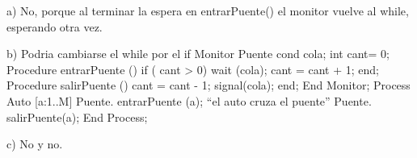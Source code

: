 a) No, porque al terminar la espera en entrarPuente() el monitor vuelve al while, esperando otra vez.

b) Podria cambiarse el while por el if
    Monitor Puente
        cond cola;
        int cant= 0;
        Procedure entrarPuente ()
            if ( cant > 0) wait (cola);
            cant = cant + 1;
        end;
        Procedure salirPuente ()
            cant = cant - 1;
            signal(cola);
        end;
    End Monitor;
    Process Auto [a:1..M]
        Puente. entrarPuente (a);
        “el auto cruza el puente”
        Puente. salirPuente(a);
    End Process;

c) No y no. 